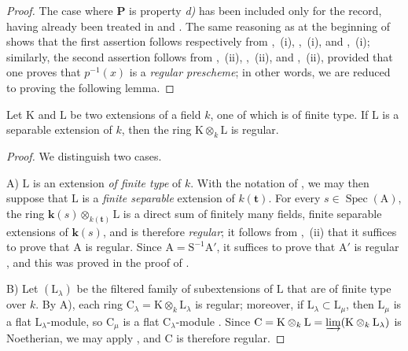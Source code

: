 \begin{proof}
The case where $\boldsymbol{P}$ is property \emph{d)} has been included only for the record, having already been treated in  and . The same reasoning as at the beginning of  shows that the first assertion follows respectively from ,~(i), ,~(i), and ,~(i); similarly, the second assertion follows from ,~(ii), ,~(ii), and ,~(ii),
provided that one proves that $p^{-1}(x)$ is a \emph{regular prescheme}; in other words, we are reduced to proving the following lemma.
\end{proof}

\begin{lemma}[6.7.4.1]
\label{IV.6.7.4.1}
Let $\mathrm{K}$ and $\mathrm{L}$ be two extensions of a field $k$, one of which is of finite type. If $\mathrm{L}$ is a separable extension of $k$, then the ring $\mathrm{K}\otimes_k\mathrm{L}$ is regular.
\end{lemma}

\begin{proof}
We distinguish two cases.

A) $\mathrm{L}$ is an extension \emph{of finite type} of $k$. With the notation of , we may then suppose that $\mathrm{L}$ is a \emph{finite separable} extension of $k(\mathbf{t})$. For every $s\in\operatorname{Spec}(\mathrm{A})$, the ring $\boldsymbol{k}(s)\otimes_{k(\mathbf{t})}\mathrm{L}$ is a direct sum of finitely many fields, finite separable extensions of $\boldsymbol{k}(s)$, and is therefore \emph{regular}; it follows from ,~(ii) that it suffices to prove that $\mathrm{A}$ is regular. Since $\mathrm{A}=\mathrm{S}^{-1}\mathrm{A}'$, it suffices to prove that $\mathrm{A}'$ is regular , and this was proved in the proof of .

B) Let $(\mathrm{L}_\lambda)$ be the filtered family of subextensions of $\mathrm{L}$ that are of finite type over $k$. By A), each ring $\mathrm{C}_\lambda=\mathrm{K}\otimes_k\mathrm{L}_\lambda$ is regular; moreover, if $\mathrm{L}_\lambda\subset\mathrm{L}_\mu$, then $\mathrm{L}_\mu$ is a flat $\mathrm{L}_\lambda$-module, so $\mathrm{C}_\mu$ is a flat $\mathrm{C}_\lambda$-module . Since $\mathrm{C}=\mathrm{K}\otimes_k\mathrm{L}=\varinjlim(\mathrm{K}\otimes_k\mathrm{L}_\lambda)$ is Noetherian, we may apply , and $\mathrm{C}$ is therefore regular.
\end{proof}

